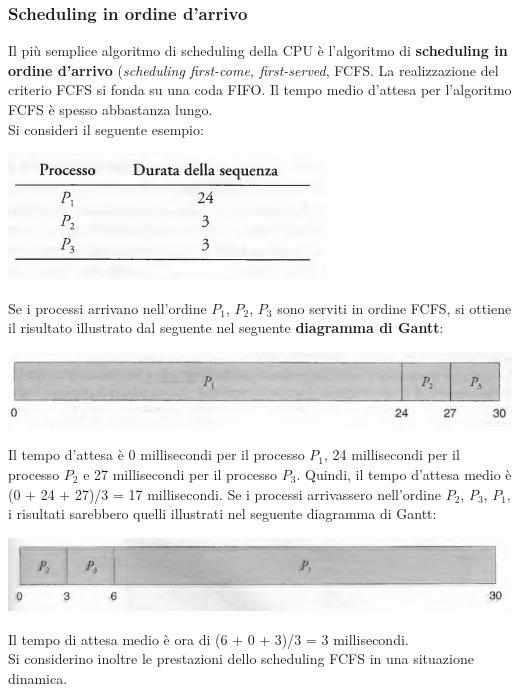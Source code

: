 \documentclass[11pt,a4paper]{article}
\begin{document}
\subsubsection{Scheduling in ordine d'arrivo}
Il più semplice algoritmo di scheduling della CPU è l'algoritmo di \textbf{scheduling in ordine d'ar­rivo} (\emph{scheduling first-come, first-served}, FCFS. La realizzazione del criterio FCFS si fonda su una coda FIFO.
Il tempo medio d'attesa per l'algoritmo FCFS è spesso abbastanza lungo.\medskip\\
Si consideri il seguente esempio:
\begin{center}
  \includegraphics[scale=0.6]{img/0015.png}
\end{center}
Se i processi arrivano nell'ordine $P_1$, $P_2$, $P_3$ sono serviti in ordine FCFS, si ottiene il risulta­to illustrato dal seguente nel seguente \textbf{diagramma di Gantt}:
\begin{center}
  \includegraphics[scale=0.5]{img/0016.png}
\end{center}
Il tempo d'attesa è 0 millisecondi per il processo $P_1$, 24 millisecondi per il processo $P_2$ e 27
millisecondi per il processo $P_3$. Quindi, il tempo d'attesa medio è (0 + 24 + 27)/3 = 17 millisecondi. Se i processi arrivassero nell'ordine $P_2$, $P_3$, $P_1$, i risultati sarebbero quelli illustrati nel seguente diagramma di Gantt:
\begin{center}
  \includegraphics[scale=0.5]{img/0017.png}
\end{center}
Il tempo di attesa medio è ora di (6 + 0 + 3)/3 = 3 millisecondi.\medskip\\
Si considerino inoltre le prestazioni dello scheduling FCFS in una situazione dinamica.
\end{document}
